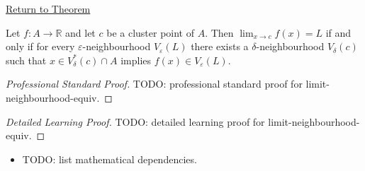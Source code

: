 \newpage
{}
\label{prf:limit-neighbourhood-equiv}

\begin{remark*}[Return]
\hyperref[prop:limit-neighbourhood-equiv]{Return to Theorem}
\end{remark*}

\begin{proposition*}
Let $f : A \to \mathbb{R}$ and let $c$ be a cluster point of $A$.
Then $\lim_{x\to c}f(x)=L$ if and only if for every
$\varepsilon$-neighbourhood $V_\varepsilon(L)$ there exists a
$\delta$-neighbourhood $V_\delta(c)$ such that
$x\in V_\delta^*(c)\cap A$ implies $f(x)\in V_\varepsilon(L)$.

\smallskip\noindent
\end{proposition*}

\begin{proof}[Professional Standard Proof]
\LRAProofBodyStart
TODO: professional standard proof for limit-neighbourhood-equiv.
\end{proof}

\begin{proof}[Detailed Learning Proof]
\LRAProofBodyStart
TODO: detailed learning proof for limit-neighbourhood-equiv.
\end{proof}

\begin{remark*}
\end{remark*}

\begin{dependencies}
\begin{itemize}
  \item TODO: list mathematical dependencies.
\end{itemize}
\end{dependencies}

\clearpage
